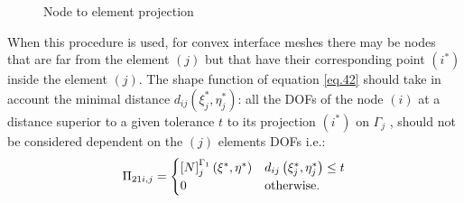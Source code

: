         \begin{figure}[!ht]
          \caption{Node to element projection}
          \label{fig.8}
        \end{figure}
     When this procedure is used, for convex interface meshes there may be nodes that are far from the element $(j)$ but  that have their corresponding point $(i^*)$ inside the element $(j)$. The shape function of equation \eqref{eq.42} should take in account the minimal distance $d_{ij}\left(\xi^*_j,\eta^*_j \right)$: all the DOFs of the node $(i)$ at a distance superior to a given tolerance $t$ to its projection  $ (i^*) $ on $ \Gamma_j $ , should not be considered dependent on the $ (j) $ elements DOFs i.e.:
     \begin{equation}
     \label{eq.46}
     \Pi_{21i,j}=\begin{cases}\left[{N}\right]_{j}^{\Gamma_1}\left(\xi^*,\eta^* \right) & d_{ij}\left(\xi^*_j,\eta^*_j \right)\leq t\\
     0 & \text{otherwise}.
     \end{cases}
     \end{equation}
